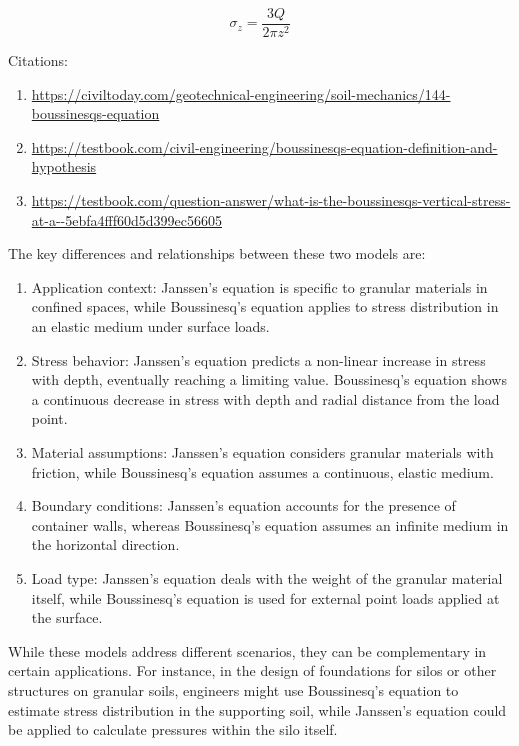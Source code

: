 \documentclass[xcolor=dvipsnames,10pt,hidelinks]{article}
\begin{document}
\begin{itemize}
\begin{itemize}
\begin{itemize}
$$ \sigma_z = \frac{3Q}{2\pi z^2} $$

Citations:
\begin{enumerate}
\item \url{https://civiltoday.com/geotechnical-engineering/soil-mechanics/144-boussinesqs-equation}
\item \url{https://testbook.com/civil-engineering/boussinesqs-equation-definition-and-hypothesis}
\item \url{https://testbook.com/question-answer/what-is-the-boussinesqs-vertical-stress-at-a--5ebfa4fff60d5d399ec56605}
\end{enumerate}
\end{itemize}
\end{itemize}


The key differences and relationships between these two models are:

\begin{enumerate}
\item Application context: Janssen's equation is specific to granular materials in confined spaces, while Boussinesq's equation applies to stress distribution in an elastic medium under surface loads.

\item Stress behavior: Janssen's equation predicts a non-linear increase in stress with depth, eventually reaching a limiting value. Boussinesq's equation shows a continuous decrease in stress with depth and radial distance from the load point.

\item Material assumptions: Janssen's equation considers granular materials with friction, while Boussinesq's equation assumes a continuous, elastic medium.

\item Boundary conditions: Janssen's equation accounts for the presence of container walls, whereas Boussinesq's equation assumes an infinite medium in the horizontal direction.

\item Load type: Janssen's equation deals with the weight of the granular material itself, while Boussinesq's equation is used for external point loads applied at the surface.
\end{enumerate}

While these models address different scenarios, they can be complementary in certain applications. For instance, in the design of foundations for silos or other structures on granular soils, engineers might use Boussinesq's equation to estimate stress distribution in the supporting soil, while Janssen's equation could be applied to calculate pressures within the silo itself.


\end{itemize}
\end{document}
